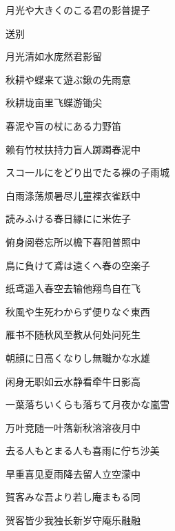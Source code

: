 \begin{haiku}
    {\FH 月光や大きくのこる君の影}\hfill{\FH 普提子}

    {\FK 送别}

    {\FK 月光清如水庞然君影留}
\end{haiku}

\begin{haiku}
    {\FH 秋耕や蝶来て遊ぶ鍬の先}\hfill{\FH 雨意}

    {\FK 秋耕垅亩里飞蝶游锄尖}
\end{haiku}

\begin{haiku}
    {\FH 春泥や盲の杖にある力}\hfill{\FH 野笛}

    {\FK 赖有竹杖扶持力盲人踯躅春泥中}
\end{haiku}

\begin{haiku}
    {\FH スコ一ルにをどり出でたる裸の子}\hfill{\FH 雨城}

    {\FK 白雨涤荡烦暑尽儿童裸衣雀跃中}
\end{haiku}

\begin{haiku}
    {\FH 読みふける春日縁にに}\hfill{\FH 米佐子}

    {\FK 俯身阅卷忘所以檐下春阳普照中}
\end{haiku}

\begin{haiku}
    {\FH 鳥に負けて鳶は遠くへ春の空}\hfill{\FH 楽子}

    {\FK 纸鸢遥入春空去输他翔鸟自在飞}
\end{haiku}

\begin{haiku}
    {\FH 秋風や生死わからず便りなぐ}\hfill{\FH 東西}

    {\FK 雁书不随秋风至教从何处问死生}
\end{haiku}

\begin{haiku}
    {\FH 朝顔に日高くなりし無職かな}\hfill{\FH 水雄}

    {\FK 闲身无职如云水静看牵牛日影高}
\end{haiku}

\begin{haiku}
    {\FH 一葉落ちいくらも落ちて月夜かな}\hfill{\FH 嵐雪}

    {\FK 万叶竞随一叶落新秋溶溶夜月中}
\end{haiku}

\begin{haiku}
    {\FH 去る人もとまる人も喜雨に佇ち}\hfill{\FH 沙美}

    {\FK 旱重喜见夏雨降去留人立空濛中}
\end{haiku}

\begin{haiku}
    {\FH 賀客みな吾より若し庵まもる}\hfill{\FH 同}

    {\FK 贺客皆少我独长新岁守庵乐融融}
\end{haiku}
